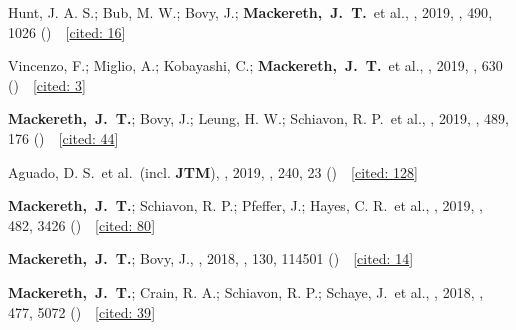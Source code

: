 \item[{\scriptsize11}]Hunt, J. A. S.; Bub, M. W.; Bovy, J.; \textbf{Mackereth,~J.~T.}~et al., , 2019, \mnras, {490}, 1026 ()~~{\footnotesize[\href{http://adsabs.harvard.edu/abs/2019MNRAS.490.1026H}{cited: 16}]}

\item[{\scriptsize10}]Vincenzo, F.; Miglio, A.; Kobayashi, C.; \textbf{Mackereth,~J.~T.}~et al., , 2019, \aanda, {630} ()~~{\footnotesize[\href{http://adsabs.harvard.edu/abs/2019A&A...630A.125V}{cited: 3}]}

\item[{\scriptsize9}]\textbf{Mackereth,~J.~T.}; Bovy, J.; Leung, H. W.; Schiavon, R. P.~et al., , 2019, \mnras, {489}, 176 ()~~{\footnotesize[\href{http://adsabs.harvard.edu/abs/2019MNRAS.489..176M}{cited: 44}]}

\item[{\scriptsize8}]Aguado, D. S.~et al.~(incl. \textbf{JTM}), , 2019, \apjs, {240}, 23 ()~~{\footnotesize[\href{http://adsabs.harvard.edu/abs/2019ApJS..240...23A}{cited: 128}]}

\item[{\scriptsize7}]\textbf{Mackereth,~J.~T.}; Schiavon, R. P.; Pfeffer, J.; Hayes, C. R.~et al., , 2019, \mnras, {482}, 3426 ()~~{\footnotesize[\href{http://adsabs.harvard.edu/abs/2019MNRAS.482.3426M}{cited: 80}]}

\item[{\scriptsize6}]\textbf{Mackereth,~J.~T.}; Bovy, J., , 2018, \pasp, {130}, 114501 ()~~{\footnotesize[\href{http://adsabs.harvard.edu/abs/2018PASP..130k4501M}{cited: 14}]}

\item[{\scriptsize5}]\textbf{Mackereth,~J.~T.}; Crain, R. A.; Schiavon, R. P.; Schaye, J.~et al., , 2018, \mnras, {477}, 5072 ()~~{\footnotesize[\href{http://adsabs.harvard.edu/abs/2018MNRAS.477.5072M}{cited: 39}]}

